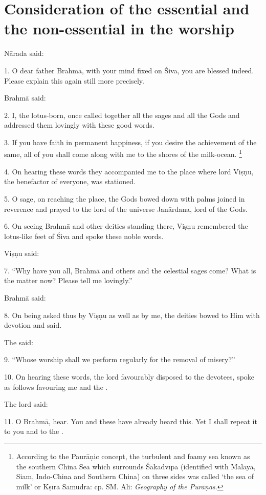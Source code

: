 \chapter{Consideration of the essential and the non-essential in the worship}

Nārada said:

1. O dear father Brahmā, with your mind fixed on Śiva, you are blessed indeed.
Please explain this again still more precisely.

Brahmā said:

2. I, the lotus-born, once called together all the sages and all the Gods and
addressed them lovingly with these good words.

3. If you have faith in permanent happiness, if you desire the achievement of
the same, all of you shall come along with me to the shores of the milk-ocean.
\footnote{According to the Paurāṇic concept, the turbulent and foamy sea known
as the southern China Sea which surrounds Śākadvīpa (identified with Malaya,
Siam, Indo-China and Southern China) on three sides was called ‘the sea of milk’
or Kṣīra Samudra: cp. SM. Ali: \emph{Geography of the Purāṇas}.}

4. On hearing these words they accompanied me to the place where lord Viṣṇu,
the benefactor of everyone, was stationed.

5. O sage, on reaching the place, the Gods bowed down with palms joined in
reverence and prayed to the lord of the universe Janārdana, lord of the Gods.

6. On seeing Brahmā and other deities standing there, Viṣṇu remembered
the lotus-like feet of Śiva and spoke these noble words.

Viṣṇu said:

7. “Why have you all, Brahmā and others and the celestial sages come? What is
the matter now? Please tell me lovingly.”

Brahmā said:

8. On being asked thus by Viṣṇu as well as by me, the deities bowed to Him with
devotion and said.

The  said:

9. “Whose worship shall we perform regularly for the removal of misery?”

10. On hearing these words, the lord favourably disposed to the devotees, spoke
as follows favouring me and the .

The lord said:

11. O Brahmā, hear. You and these  have already heard this. Yet I
shall repeat it to you and to the .


